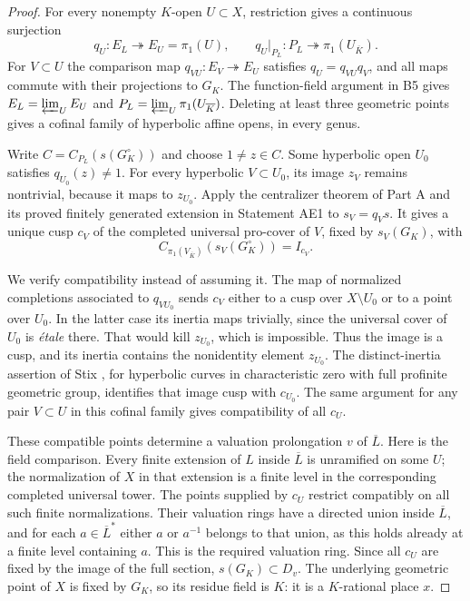 \documentclass[11pt,a4paper]{article}
\begin{document}
\begin{proof}
For every nonempty $K$-open $U\subset X$, restriction gives a continuous
surjection
\[
 q_U:E_L\twoheadrightarrow E_U=\pi_1(U),
 \qquad q_U|_{P_L}:P_L\twoheadrightarrow\pi_1(U_{\overline K}).
\]
For $V\subset U$ the comparison map $q_{VU}:E_V\twoheadrightarrow E_U$
satisfies $q_U=q_{VU}q_V$, and all maps commute with their projections to
$G_K$. The function-field argument in B5 gives
$E_L=\varprojlim_U E_U$ and
$P_L=\varprojlim_U\pi_1(U_{\overline K})$.
Deleting at least three geometric points gives a cofinal family of
hyperbolic affine opens, in every genus.

Write $C=C_{P_L}(s(G_K^\circ))$ and choose $1\ne z\in C$.
Some hyperbolic open $U_0$ satisfies $q_{U_0}(z)\ne1$.
For every hyperbolic $V\subset U_0$, its image $z_V$ remains nontrivial,
because it maps to $z_{U_0}$. Apply the centralizer theorem of Part A and its proved finitely generated extension in Statement AE1 to
$s_V=q_Vs$. It gives a unique cusp $c_V$ of the completed universal
pro-cover of $V$, fixed by $s_V(G_K)$, with
\[
 C_{\pi_1(V_{\overline K})}(s_V(G_K^\circ))=I_{c_V}.
\]

We verify compatibility instead of assuming it. The map of normalized
completions associated to $q_{VU_0}$ sends $c_V$ either to a cusp over
$X\setminus U_0$ or to a point over $U_0$. In the latter case its inertia
maps trivially, since the universal cover of $U_0$ is \emph{\'etale}
there. That would kill $z_{U_0}$, which is impossible. Thus the image is
a cusp, and its inertia contains the nonidentity element $z_{U_0}$.
The distinct-inertia assertion of Stix
\cite[Proposition 11]{B_Stix2008}, for hyperbolic curves in characteristic
zero with full profinite geometric group, identifies that image cusp
with $c_{U_0}$. The same argument for any pair $V\subset U$ in this
cofinal family gives compatibility of all $c_U$.

These compatible points determine a valuation prolongation $v$ of
$\overline L$. Here is the field comparison. Every finite extension of
$L$ inside $\overline L$ is unramified on some $U$; the normalization of
$X$ in that extension is a finite level in the corresponding completed
universal tower. The points supplied by $c_U$ restrict compatibly on all
such finite normalizations. Their valuation rings have a directed union
inside $\overline L$, and for each $a\in\overline L^*$ either $a$ or
$a^{-1}$ belongs to that union, as this holds already at a finite level
containing $a$. This is the required valuation ring. Since all $c_U$ are
fixed by the image of the full section, $s(G_K)\subset D_v$. The
underlying geometric point of $X$ is fixed by $G_K$, so its residue field
is $K$: it is a $K$-rational place $x$.


\end{proof}
\end{document}
